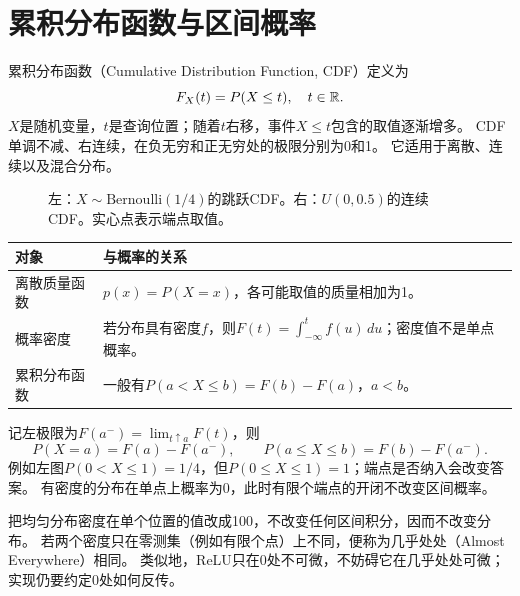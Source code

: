 \section{累积分布函数与区间概率}
\label{sec:math-cdf}
累积分布函数（Cumulative Distribution Function, CDF）定义为
\[
 F_X(t)=P(X\leq t),\quad t\in\mathbb{R}.
\]
$X$是随机变量，$t$是查询位置；随着$t$右移，事件$X\leq t$包含的取值逐渐增多。
CDF单调不减、右连续，在负无穷和正无穷处的极限分别为0和1。
它适用于离散、连续以及混合分布。

\begin{figure}[htbp]
\centering
\caption{左：$X\sim\mathrm{Bernoulli}(1/4)$的跳跃CDF。右：$U(0,0.5)$的连续CDF。实心点表示端点取值。}
\par\smallskip
{}
\end{figure}

\begin{center}
\begin{tabularx}{\textwidth}{P{30mm}Y}
\toprule
对象 & 与概率的关系\\
\midrule
离散质量函数 & $p(x)=P(X=x)$，各可能取值的质量相加为1。\\
概率密度 & 若分布具有密度$f$，则$F(t)=\int_{-\infty}^t f(u)\,du$；密度值不是单点概率。\\
累积分布函数 & 一般有$P(a<X\leq b)=F(b)-F(a)$，$a<b$。\\
\bottomrule
\end{tabularx}
\end{center}

记左极限为$F(a^-)=\lim_{t\uparrow a}F(t)$，则
\[
 P(X=a)=F(a)-F(a^-),\qquad
 P(a\leq X\leq b)=F(b)-F(a^-).
\]
例如左图$P(0<X\leq1)=1/4$，但$P(0\leq X\leq1)=1$；端点是否纳入会改变答案。
有密度的分布在单点上概率为0，此时有限个端点的开闭不改变区间概率。

\begin{pitfall}[几乎处处不等于处处]
把均匀分布密度在单个位置的值改成100，不改变任何区间积分，因而不改变分布。
若两个密度只在零测集（例如有限个点）上不同，便称为几乎处处（Almost Everywhere）相同。
类似地，ReLU只在0处不可微，不妨碍它在几乎处处可微；实现仍要约定0处如何反传。
\end{pitfall}
